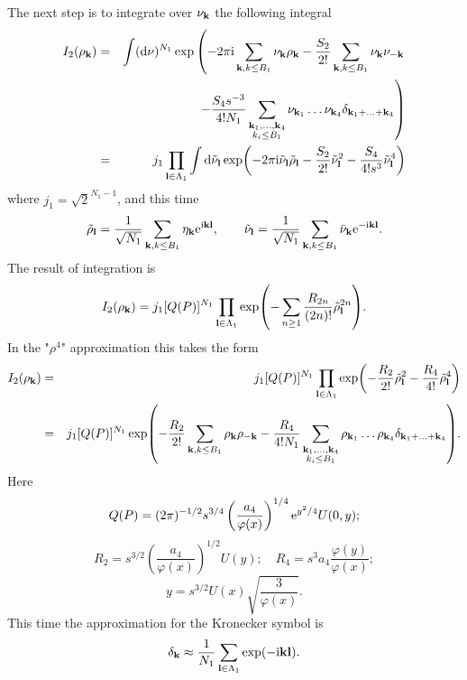 The next step is to integrate over $\nu_{\vb k}$ the following integral
\begin{eqnarray*}
	I_2(\rho_{\vb k}) & = & \int ({\rm d} \nu)^{N_1} 
	\exp 
	\left(-2\pi{\rm i} \sum_{\vb k, k \leq B_1} \nu_{\vb k}\rho_{\vb k} 
		-\frac{S_2}{2!} \sum_{\vb k, k \leq B_1} \nu_{\vb k}\nu_{-\vb k}
	\right.
	\\
	& &
	\left. 
		- \frac{S_4 s^{-3}}{4! N_1} \sum_{\substack{\vb k_1, \dotsc, \vb k_4 \\ k_i \leq B_1}} \nu_{\vb k_1} \dotsc \nu_{\vb k_4} \delta_{\vb{k}_1 + \dotsc + \vb{k}_4}
	\right)
	\\
	& = &
	j_1 \prod_{\vb l \in \Lambda_1} \int {\rm d} \tilde{\nu}_{\vb l} 
	\exp(-2\pi {\rm i} \tilde{\nu}_{\vb l} \tilde{\rho}_{\vb l} - \frac{S_2}{2!}\tilde{\nu}_{\vb l}^2
	- \frac{S_4}{4! s^3} \tilde{\nu}_{\vb l}^4  )
\end{eqnarray*}
where $j_1 = \sqrt{2}^{N_1 - 1}$, and this time
\begin{equation*}
	\tilde{\rho}_{\vb l} = \frac{1}{\sqrt{N_1}}\sum_{\vb k, k \leq B_1}\eta_{\vb k}{\rm e}^{{\rm i}{\vb k}{\vb l}}, \qquad \tilde{\nu}_{\vb l}=\frac{1}{\sqrt{N_1}}\sum_{\vb k, k \leq B_1}\bar{\nu}_{\vb k}{\rm e}^{-{\rm i}{\vb k}{\vb l}}.
\end{equation*}
The result of integration is
\begin{equation*}
	I_2(\rho_{\vb k}) = j_1 [Q(P)]^{N_1} \prod_{\vb l \in \Lambda_1} 
	\exp(- \sum_{n \geq 1} \frac{R_{2n}}{(2n)!} \tilde{\rho}_{\vb l}^{2n} ).
\end{equation*}
In the "$\rho^4$" approximation this takes the form
\begin{eqnarray*}
	I_2(\rho_{\vb k}) & = & j_1 [Q(P)]^{N_1} \prod_{\vb l \in \Lambda_1}
	\exp( - \frac{R_2}{2!} \tilde{\rho}_{\vb l}^2 - \frac{R_4}{4!} \tilde{\rho}_{\vb l}^4)
	\\
	& = & j_1 [Q(P)]^{N_1} 
	\exp( -\frac{R_2}{2!} \sum_{\vb k, k \leq B_1} \rho_{\vb k} \rho_{-\vb k} - \frac{R_4}{4!N_1} 
	\sum_{\substack{\vb k_1, \dotsc, \vb k_4 \\ k_i \leq B_1}} \rho_{\vb k_1} \dotsc \rho_{\vb k_4} \delta_{\vb{k}_1 + \dotsc + \vb{k}_4}).
\end{eqnarray*}
Here
\begin{equation*}
	Q(P) = (2\pi)^{-1/2} s^{3/4} \left(\frac{a_4}{\varphi(x)}\right)^{1/4} {\rm e}^{y^2/4} U(0,y);
\end{equation*}
\begin{equation*}
	R_2 = s^{3/2} \left(\frac{a_4}{\varphi(x)}\right)^{1/2} U(y); \quad R_4 = s^3 a_4 \frac{\varphi(y)}{\varphi(x)};
\end{equation*}
\begin{equation*}
	y = s^{3/2} U(x) \sqrt{\frac{3}{\varphi(x)}}.
\end{equation*}
This time the approximation for the Kronecker symbol is 
$$
	\delta_{\vb k} \approx \frac{1}{N_1} \sum_{\vb l \in \Lambda_1} \exp(-{\rm i} \vb{k} \vb{l}).
$$

